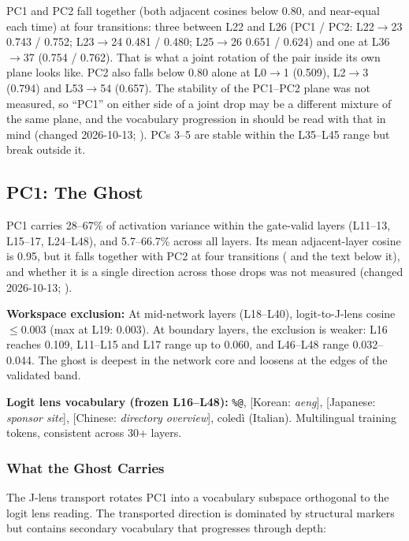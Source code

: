 \documentclass[11pt,a4paper]{article}
\begin{document}
PC1 and PC2 fall together (both adjacent cosines below 0.80, and near-equal each time) at four transitions: three between L22 and L26 (PC1 / PC2: L22$\to$23 0.743 / 0.752; L23$\to$24 0.481 / 0.480; L25$\to$26 0.651 / 0.624) and one at L36$\to$37 (0.754 / 0.762). That is what a joint rotation of the pair inside its own plane looks like. PC2 also falls below 0.80 alone at L0$\to$1 (0.509), L2$\to$3 (0.794) and L53$\to$54 (0.657). The stability of the PC1--PC2 plane was not measured, so ``PC1'' on either side of a joint drop may be a different mixture of the same plane, and the vocabulary progression in  should be read with that in mind (changed 2026-10-13; ). PCs 3--5 are stable within the L35--L45 range but break outside it.

\subsection{PC1: The Ghost}

PC1 carries 28--67\% of activation variance within the gate-valid layers (L11--13, L15--17, L24--L48), and 5.7--66.7\% across all layers. Its mean adjacent-layer cosine is 0.95, but it falls together with PC2 at four transitions ( and the text below it), and whether it is a single direction across those drops was not measured (changed 2026-10-13; ).

\textbf{Workspace exclusion:} At mid-network layers (L18--L40), logit-to-J-lens cosine $\leq 0.003$ (max at L19: 0.003). At boundary layers, the exclusion is weaker: L16 reaches 0.109, L11--L15 and L17 range up to 0.060, and L46--L48 range 0.032--0.044. The ghost is deepest in the network core and loosens at the edges of the validated band.

\textbf{Logit lens vocabulary (frozen L16--L48):} \texttt{\%@}, [Korean: \textit{aeng}], [Japanese: \textit{sponsor site}], [Chinese: \textit{directory overview}], coled\`{i} (Italian). Multilingual training tokens, consistent across 30+ layers.

\subsubsection{What the Ghost Carries}
\label{sec:ghost-carries}

The J-lens transport rotates PC1 into a vocabulary subspace orthogonal to the logit lens reading. The transported direction is dominated by structural markers but contains secondary vocabulary that progresses through depth:
\end{document}

